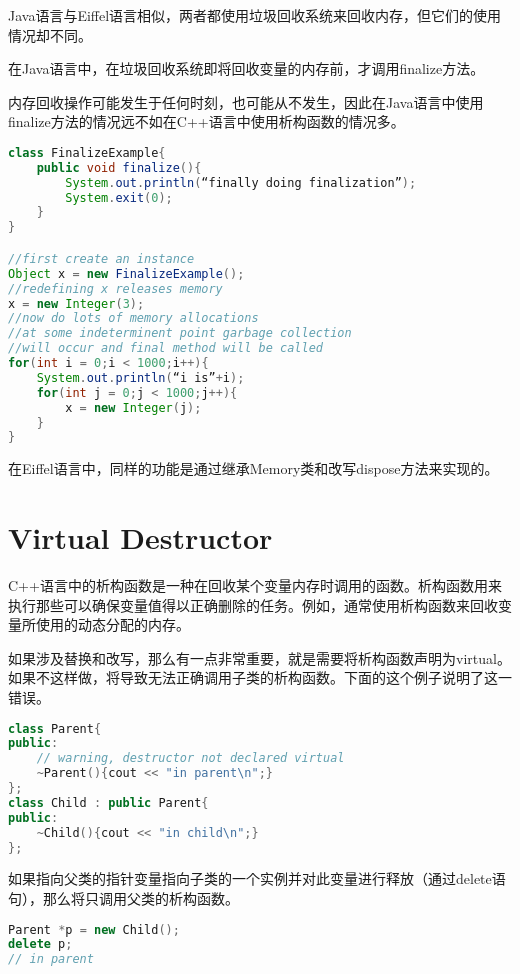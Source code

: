 Java语言与Eiffel语言相似，两者都使用垃圾回收系统来回收内存，但它们的使用情况却不同。

\begin{compactitem}
\item 在Java语言中，在垃圾回收系统即将回收变量的内存前，才调用finalize方法。

内存回收操作可能发生于任何时刻，也可能从不发生，因此在Java语言中使用finalize方法的情况远不如在C++语言中使用析构函数的情况多。


\begin{lstlisting}[language=Java]
class FinalizeExample{
	public void finalize(){
		System.out.println(“finally doing finalization”);
		System.exit(0);
	}
}

//first create an instance
Object x = new FinalizeExample();
//redefining x releases memory
x = new Integer(3);
//now do lots of memory allocations
//at some indeterminent point garbage collection
//will occur and final method will be called
for(int i = 0;i < 1000;i++){
	System.out.println(“i is”+i);
	for(int j = 0;j < 1000;j++){
		x = new Integer(j);
	}
}
\end{lstlisting}

\item 在Eiffel语言中，同样的功能是通过继承Memory类和改写dispose方法来实现的。
\end{compactitem}

\section{Virtual Destructor}

C++语言中的析构函数是一种在回收某个变量内存时调用的函数。析构函数用来执行那些可以确保变量值得以正确删除的任务。例如，通常使用析构函数来回收变量所使用的动态分配的内存。

如果涉及替换和改写，那么有一点非常重要，就是需要将析构函数声明为virtual。如果不这样做，将导致无法正确调用子类的析构函数。下面的这个例子说明了这一错误。


\begin{lstlisting}[language=C++]
class Parent{
public:
	// warning, destructor not declared virtual
	~Parent(){cout << "in parent\n";}
};
class Child : public Parent{
public:
	~Child(){cout << "in child\n";}
};
\end{lstlisting}

如果指向父类的指针变量指向子类的一个实例并对此变量进行释放（通过delete语句），那么将只调用父类的析构函数。



\begin{lstlisting}[language=C++]
Parent *p = new Child();
delete p;
// in parent
\end{lstlisting}


